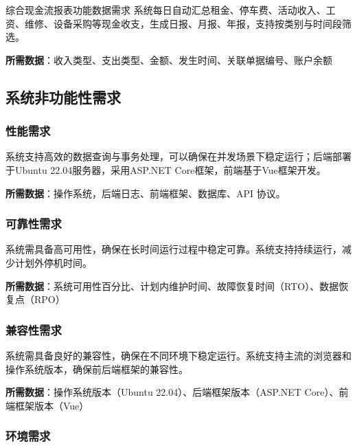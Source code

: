 \documentclass[]{article}
\begin{document}
综合现金流报表功能数据需求
系统每日自动汇总租金、停车费、活动收入、工资、维修、设备采购等现金收支，生成日报、月报、年报，支持按类别与时间段筛选。

\textbf{所需数据}：收入类型、支出类型、金额、发生时间、关联单据编号、账户余额

\hypertarget{ux7cfbux7edfux975eux529fux80fdux6027ux9700ux6c42}{%
\subsection{系统非功能性需求}\label{ux7cfbux7edfux975eux529fux80fdux6027ux9700ux6c42}}

\hypertarget{ux6027ux80fdux9700ux6c42}{%
\subsubsection{性能需求}\label{ux6027ux80fdux9700ux6c42}}

系统支持高效的数据查询与事务处理，可以确保在并发场景下稳定运行；后端部署于Ubuntu
22.04服务器，采用ASP.NET Core框架，前端基于Vue框架开发。

\textbf{所需数据}：操作系统，后端日志、前端框架、数据库、API 协议。

\hypertarget{ux53efux9760ux6027ux9700ux6c42}{%
\subsubsection{可靠性需求}\label{ux53efux9760ux6027ux9700ux6c42}}

系统需具备高可用性，确保在长时间运行过程中稳定可靠。系统支持持续运行，减少计划外停机时间。

\textbf{所需数据}：系统可用性百分比、计划内维护时间、故障恢复时间（RTO）、数据恢复点（RPO）

\hypertarget{ux517cux5bb9ux6027ux9700ux6c42}{%
\subsubsection{兼容性需求}\label{ux517cux5bb9ux6027ux9700ux6c42}}

系统需具备良好的兼容性，确保在不同环境下稳定运行。系统支持主流的浏览器和操作系统版本，确保前后端框架的兼容性。

\textbf{所需数据}：操作系统版本（Ubuntu 22.04）、后端框架版本（ASP.NET
Core）、前端框架版本（Vue）

\hypertarget{ux73afux5883ux9700ux6c42}{%
\subsubsection{环境需求}\label{ux73afux5883ux9700ux6c42}}
\end{document}
